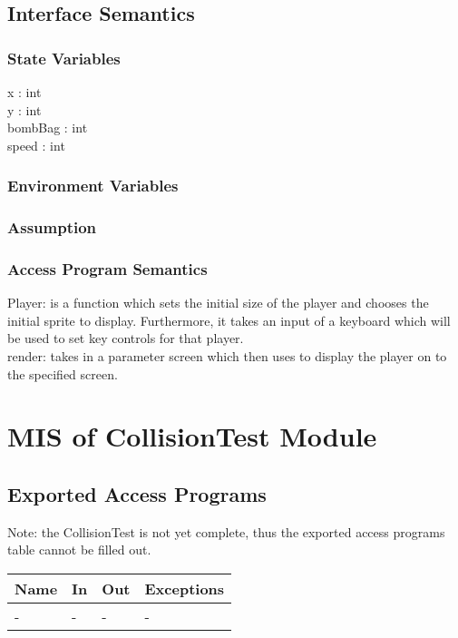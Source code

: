 \documentclass[12pt, letterpaper]{article}
\begin{document}
	\subsection{Interface Semantics}
	
	\subsubsection{State Variables}
	
	x : int \\
	y : int \\
	bombBag : int \\
	speed : int \\
	
	\subsubsection{Environment Variables}
	
	\subsubsection{Assumption}
	
	\subsubsection{Access Program Semantics}
	
	Player: is a function which sets the initial size of the player and chooses \indent the initial sprite to display. Furthermore, it takes an input of a keyboard \indent which will be used to set key controls for that player.\\
	render: takes in a parameter screen which then uses to display the player on \indent to the specified screen.\\
	
	\section{MIS of CollisionTest Module}
	
	\subsection{Exported Access Programs}
	Note: the CollisionTest is not yet complete, thus the exported access programs table cannot be filled out.
			\begin{center}
				\begin{tabular}{ p{4cm} p{3cm} p{3cm} p{4cm} }
					\hline
					\textbf{Name} & \textbf{In} & \textbf{Out} & \textbf{Exceptions}\\ 
					\hline
					- & - & - & -  \\ 
					\hline
					
				\end{tabular}				
			\end{center}
	
\end{document}
